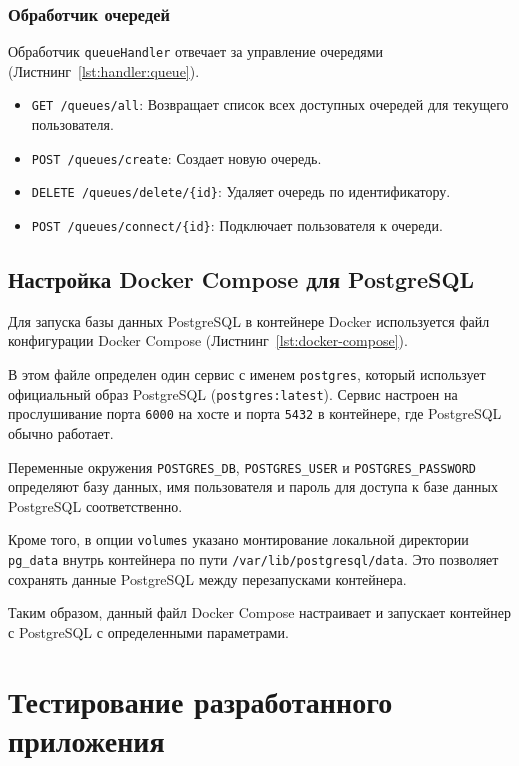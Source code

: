 \subsubsection{Обработчик очередей}
Обработчик \texttt{queueHandler} отвечает за управление очередями
(Листнинг~\ref{lst:handler:queue}).

\begin{itemize}
    \item \texttt{GET /queues/all}: Возвращает список всех доступных очередей
		для текущего пользователя.
    \item \texttt{POST /queues/create}: Создает новую очередь.
    \item \texttt{DELETE /queues/delete/\{id\}}:
		Удаляет очередь по идентификатору.
    \item \texttt{POST /queues/connect/\{id\}}:
		Подключает пользователя к очереди.
\end{itemize}

\subsection{Настройка Docker Compose для PostgreSQL}

Для запуска базы данных PostgreSQL в контейнере Docker используется файл
конфигурации Docker Compose (Листнинг~\ref{lst:docker-compose}).\par
В этом файле определен один сервис с именем \texttt{postgres},
который использует официальный образ PostgreSQL (\texttt{postgres:latest}).
Сервис настроен на прослушивание порта \texttt{6000} на хосте
и порта \texttt{5432} в контейнере, где PostgreSQL обычно работает.\par
Переменные окружения \texttt{POSTGRES\_DB}, \texttt{POSTGRES\_USER}
и \texttt{POSTGRES\_PASSWORD} определяют базу данных, имя пользователя
и пароль для доступа к базе данных PostgreSQL соответственно.\par
Кроме того, в опции \texttt{volumes} указано монтирование локальной директории 
\texttt{pg\_data} внутрь контейнера по пути \texttt{/var/lib/postgresql/data}. 
Это позволяет сохранять данные PostgreSQL между перезапусками контейнера.\par
Таким образом, данный файл Docker Compose настраивает и запускает контейнер
с PostgreSQL с определенными параметрами.

\section{Тестирование разработанного приложения}

